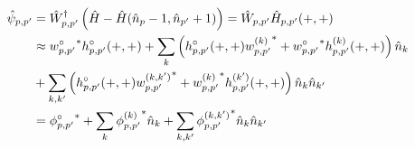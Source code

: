 \begin{appendix}
\begin{subequations}
\begin{align}
\hat\psi_{p,p^\prime}&=\hat W^\dagger_{p,p^\prime} \left(\hat H - \hat H(\hat n_p-1,\hat n_{p^\prime}+1)\right)=\hat W_{p,p^\prime}\hat H_{p,p^\prime}(+,+)\nonumber\\
&\approx  {w_{p,p^\prime}^{\circ}}^*h^{\circ}_{p,p^\prime}(+,+)+\sum\limits_k \left(h^\circ_{p,p^\prime}(+,+) {w_{p,p^\prime}^{(k)}}^* + {w_{p,p^\prime}^{\circ}}^*h^{(k)}_{p,p^\prime}(+,+)\right)\hat n_k \nonumber\\
&+ \sum\limits_{k,k^\prime} \left( h^\circ_{p,p^\prime}(+,+) {w_{p,p^\prime}^{(k,k^\prime)}}^*+{w_{p,p^\prime}^{(k)}}^*h^{(k^\prime)}_{p,p^\prime}(+,+)\right)\hat n_k\hat n_{k^\prime}\nonumber\\
&= {\phi_{p,p^\prime}^{\circ}}^* + \sum\limits_k {\phi_{p,p^\prime}^{(k)}}^*\hat n_k + \sum\limits_{k,k^\prime} {\phi_{p,p^\prime}^{(k,k^\prime)}}^*\hat n_k\hat n_ {k^\prime}
\end{align}
\end{subequations}


























\end{appendix}
